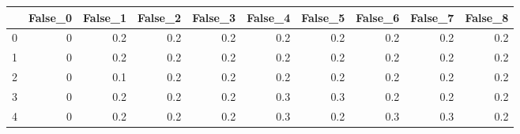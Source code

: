 \begin{tabular}{lrrrrrrrrr}
\toprule
{} &  False\_0 &  False\_1 &  False\_2 &  False\_3 &  False\_4 &  False\_5 &  False\_6 &  False\_7 &  False\_8 \\ \hline
\midrule
0 &        0 &      0.2 &      0.2 &      0.2 &      0.2 &      0.2 &      0.2 &      0.2 &      0.2 \\ \hline
1 &        0 &      0.2 &      0.2 &      0.2 &      0.2 &      0.2 &      0.2 &      0.2 &      0.2 \\ \hline
2 &        0 &      0.1 &      0.2 &      0.2 &      0.2 &      0.2 &      0.2 &      0.2 &      0.2 \\ \hline
3 &        0 &      0.2 &      0.2 &      0.2 &      0.3 &      0.3 &      0.2 &      0.2 &      0.2 \\ \hline
4 &        0 &      0.2 &      0.2 &      0.2 &      0.3 &      0.2 &      0.3 &      0.3 &      0.2 \\ \hline
\bottomrule
\end{tabular}
